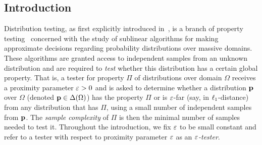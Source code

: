 \newcommand{\kfunctional}[4]{K(#1,#2,#3,#4)}
\newcommand{\kf}[1]{\kappa_{#1}}
%
\newcommand{\pdistfunc}[1][\p]{\operatorname{dist}_{#1}}
\newcommand{\pweightfunc}[1][\p]{\operatorname{weight}_{#1}}
\newcommand{\pdist}[3][\p]{\pdistfunc[#1]\mleft({#2, #3}\mright)}
\newcommand{\pweight}[2][\p]{\pweightfunc[#1]\mleft({#2}\mright)}
%
\newcommand{\SMP}{\ensuremath{\mathsf{SMP}}}

\newcommand{\code}{\ensuremath{\mathcal{C}}}
\newcommand{\EQ}[1][n]{\textsc{Eq}_{#1}}


\subsection{Introduction}\label{sec:intro}
Distribution testing, as first explicitly introduced in~\cite{BFRSW:00}, is a branch of property testing~\cite{RS:96,GGR:98} concerned with the study of sublinear algorithms for making approximate decisions regarding probability distributions over massive domains. These algorithms are granted access to independent samples from an unknown distribution and are required to \emph{test} whether this distribution has a certain global property. That is, a tester for property $\Pi$ of distributions over domain $\Omega$ receives a proximity parameter $\eps>0$ and is asked to determine whether a distribution $\p$ over $\Omega$ (denoted $\p\in\distribs{\Omega}$) has the property $\Pi$ or is $\eps$-far (say, in $\lp[1]$-distance) from any distribution that has $\Pi$, using a small number of independent samples from $\p$. The \emph{sample complexity} of $\Pi$ is then the minimal number of samples needed to test it. Throughout the introduction, we fix $\eps$ to be small constant and refer to a tester with respect to proximity parameter $\eps$ as an \emph{$\eps$-tester}.

